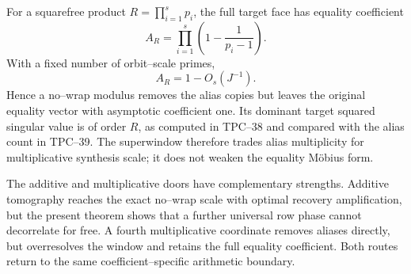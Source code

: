 For a squarefree product \(R=\prod_{i=1}^{s}p_i\), the full target face
has equality coefficient
\begin{equation}
 A_R=\prod_{i=1}^{s}\left(1-\frac1{p_i-1}\right).
 \label{eq:tpc40-superwindow-equality-coefficient}
\end{equation}
With a fixed number of orbit--scale primes,
\begin{equation}
 A_R=1-O_s(J^{-1}).
 \label{eq:tpc40-superwindow-equality-unsuppressed}
\end{equation}
Hence a no--wrap modulus removes the alias copies but leaves the original
equality vector with asymptotic coefficient one.  Its dominant target
squared singular value is of order \(R\), as computed in TPC--38 and
compared with the alias count in TPC--39.  The superwindow therefore
trades alias multiplicity for multiplicative synthesis scale; it does not
weaken the equality M\"obius form.

The additive and multiplicative doors have complementary strengths.
Additive tomography reaches the exact no--wrap scale with optimal recovery
amplification, but the present theorem shows that a further universal row
phase cannot decorrelate for free.  A fourth multiplicative coordinate
removes aliases directly, but overresolves the window and retains the full
equality coefficient.  Both routes return to the same coefficient--specific
arithmetic boundary.
